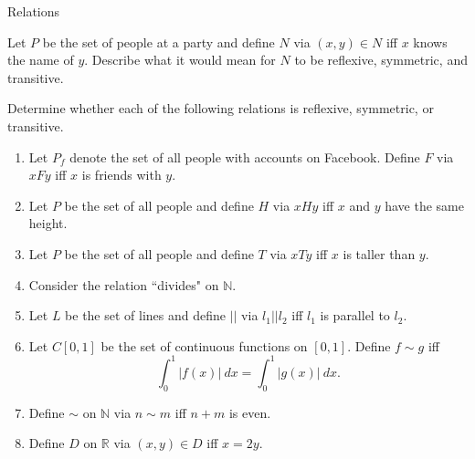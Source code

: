 \begin{section}{Relations}
\begin{exercise}
Let $P$ be the set of people at a party and define $N$ via $(x,y)\in N$ iff $x$ knows the name of $y$.  Describe what it would mean for $N$ to be reflexive, symmetric, and transitive.
\end{exercise}

\begin{exercise}
Determine whether each of the following relations is reflexive, symmetric, or transitive.

\begin{enumerate}[label=\textrm{(\alph*)}]
\item Let $P_f$ denote the set of all people with accounts on Facebook.  Define  $F$ via $xFy$ iff $x$ is friends with $y$. 
\item Let $P$ be the set of all people and define $H$ via $xHy$ iff $x$ and $y$ have the same height.
\item Let $P$ be the set of all people and define $T$ via $xTy$ iff $x$ is taller than $y$.
\item Consider the relation ``divides" on $\mathbb{N}$.
\item Let $L$ be the set of lines and define $||$ via $l_1||l_2$ iff $l_1$ is parallel to $l_2$.
\item Let $C[0,1]$ be the set of continuous functions on $[0,1]$.  Define $f\sim g$ iff
\[
\int_0^1|f(x)|\ dx=\int_0^1|g(x)|\ dx.
\]
\item Define $\sim$ on $\mathbb{N}$ via $n\sim m$ iff $n+m$ is even.
\item Define $D$ on $\mathbb{R}$ via $(x,y)\in D$ iff $x=2y$.
\end{enumerate}
\end{exercise}

\end{section}
